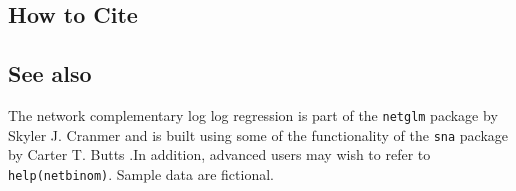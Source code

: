 \subsection* {How to Cite} 



\subsection* {See also}
The network complementary log log regression is part of the {\tt netglm} package by Skyler J. Cranmer and is built using some of the functionality of the  {\tt sna} package by Carter T. Butts \citep{ButCar01}.In addition, advanced users may wish to refer to {\tt help(netbinom)}. Sample data are fictional.
